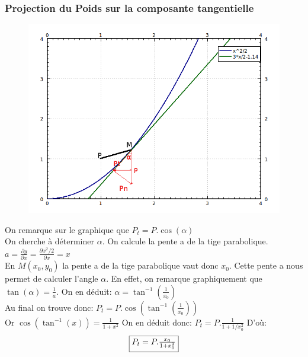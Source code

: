 \documentclass[10pt,a4paper]{article}
\begin{document}
\subsubsection{Projection du Poids sur la composante tangentielle}
\begin{figure}[H]
	\includegraphics[scale=0.7]{GraphMathZoomProjectionPoids.png}
\end{figure}

On remarque sur le graphique que $P_t=P.\cos(\alpha)$\\
On cherche à déterminer $\alpha$.
On calcule la pente a de la tige parabolique. $a=\frac{\partial y}{\partial x}=\frac{\partial x^2/2}{\partial x}=x$ \\
En $M(x_0,y_0)$ la pente a de la tige parabolique vaut donc $x_0$.
Cette pente a nous permet de calculer l'angle $\alpha$. En effet, on remarque graphiquement que $\tan(\alpha)=\frac{1}{a}$. On en déduit: $\alpha=\tan^{-1}(\frac{1}{x_0})$\\
Au final on trouve donc: $P_t=P.\cos(\tan^{-1}(\frac{1}{x_0})) $\\
Or $\cos(\tan^{-1}(x))=\frac{1}{1+x^2}$  On en déduit donc: $P_t=P.\frac{1}{1+1/x^2_0}$ D'où: 
\[\fbox{$P_t=P.\frac{x_0}{1+x^2_0}$}\]
\end{document}
